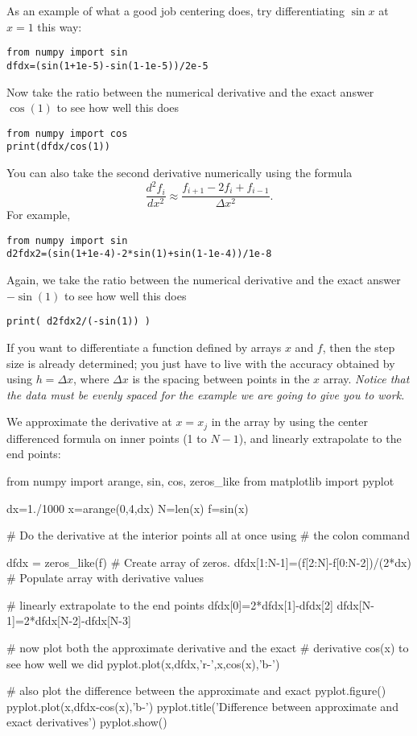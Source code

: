 As an example of what a good job centering does, try differentiating
$\sin{x}$ at $x=1$ this way:
\begin{Verbatim}
from numpy import sin
dfdx=(sin(1+1e-5)-sin(1-1e-5))/2e-5
\end{Verbatim}
Now take the ratio between the numerical derivative and the exact answer
$\cos(1)$ to see how well this does
\begin{Verbatim}
from numpy import cos
print(dfdx/cos(1))
\end{Verbatim}
You can also take the second derivative numerically using the formula
\begin{equation}
\frac{d^2 f_i }{ dx^2} \approx
\frac{f_{i+1}-2 f_i+f_{i-1} }{ \Delta x^2} .
\end{equation}
For example,
\begin{Verbatim}
from numpy import sin
d2fdx2=(sin(1+1e-4)-2*sin(1)+sin(1-1e-4))/1e-8
\end{Verbatim}
Again, we take the ratio between the numerical derivative and the exact
answer $-\sin(1)$ to see how well this does
\begin{Verbatim}
print( d2fdx2/(-sin(1)) )
\end{Verbatim}



 If you want to differentiate a function
defined by arrays $x$ and $f$, then the step size is already determined; you
just have to live with the accuracy obtained by using $h=\Delta x$, where
$\Delta x$ is the spacing between points in the $x$ array.  {\it Notice that
the data must be evenly spaced for the example we are going to give you to
work.}

We approximate the derivative at $x=x_j$ in the array by using the center differenced formula on inner points (1 to $N-1$), and linearly extrapolate to the end points:

\begin{codeexample}
\begin{VerbatimOut}{\listingFile}
from numpy import arange, sin, cos, zeros_like
from matplotlib import pyplot

dx=1./1000
x=arange(0,4,dx)
N=len(x)
f=sin(x)

# Do the derivative at the interior points all at once using
# the colon command

dfdx = zeros_like(f)  # Create array of zeros.
dfdx[1:N-1]=(f[2:N]-f[0:N-2])/(2*dx)  # Populate array with derivative values

# linearly extrapolate to the end points
dfdx[0]=2*dfdx[1]-dfdx[2]
dfdx[N-1]=2*dfdx[N-2]-dfdx[N-3]

# now plot both the approximate derivative and the exact
# derivative cos(x) to see how well we did
pyplot.plot(x,dfdx,'r-',x,cos(x),'b-')

# also plot the difference between the approximate and exact
pyplot.figure()
pyplot.plot(x,dfdx-cos(x),'b-')
pyplot.title('Difference between approximate and exact derivatives')
pyplot.show()
\end{VerbatimOut}
\end{codeexample}

